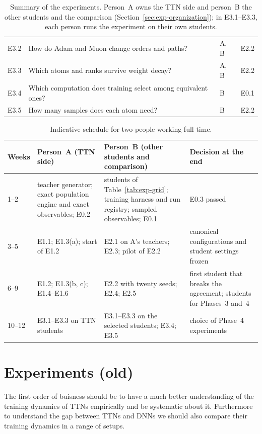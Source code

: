 \documentclass[11pt]{article}
\theoremstyle{definition}
\numberwithin{equation}{section}
\begin{document}
\begin{table}[tbp]
\begin{tabular}{p{}p{}p{}p{}}
\raggedright E3.2 & \raggedright How do Adam and Muon change orders and paths? & \raggedright A, B & \raggedright E2.2 \tabularnewline
\raggedright E3.3 & \raggedright Which atoms and ranks survive weight decay? & \raggedright A, B & \raggedright E2.2 \tabularnewline
\raggedright E3.4 & \raggedright Which computation does training select among equivalent ones? & \raggedright B & \raggedright E0.1 \tabularnewline
\raggedright E3.5 & \raggedright How many samples does each atom need? & \raggedright B & \raggedright E2.2 \tabularnewline
\hline
\end{tabular}
\caption{Summary of the experiments. Person~A owns the TTN side and person~B the other students and the comparison (Section~\ref{sec:exp-organization}); in E3.1--E3.3, each person runs the experiment on their own students.}
\label{tab:exp-summary}
\end{table}

\begin{table}[tbp]
\centering
\footnotesize
\renewcommand{\arraystretch}{1.25}
\begin{tabular}{p{}p{}p{}p{}}
\hline
\raggedright Weeks & \raggedright Person~A (TTN side) & \raggedright Person~B (other students and comparison) & \raggedright Decision at the end \tabularnewline
\hline
\raggedright 1--2 & \raggedright teacher generator; exact population engine and exact observables; E0.2 & \raggedright students of Table~\ref{tab:exp-grid}; training harness and run registry; sampled observables; E0.1 & \raggedright E0.3 passed \tabularnewline
\raggedright 3--5 & \raggedright E1.1; E1.3(a); start of E1.2 & \raggedright E2.1 on A's teachers; E2.3; pilot of E2.2 & \raggedright canonical configurations and student settings frozen \tabularnewline
\raggedright 6--9 & \raggedright E1.2; E1.3(b, c); E1.4--E1.6 & \raggedright E2.2 with twenty seeds; E2.4; E2.5 & \raggedright first student that breaks the agreement; students for Phases~3 and~4 \tabularnewline
\raggedright 10--12 & \raggedright E3.1--E3.3 on TTN students & \raggedright E3.1--E3.3 on the selected students; E3.4; E3.5 & \raggedright choice of Phase~4 experiments \tabularnewline
\hline
\end{tabular}
\caption{Indicative schedule for two people working full time.}
\label{tab:exp-plan}
\end{table}

\section{Experiments (old)}\label{sec:experiments-old}
The first order of buisness should be to have a much better understanding of the training dynamics of TTNs empirically and be systematic about it. Furthermore to understand the gap between TTNs and DNNs we should also compare their training dynamics in a range of setups. 
\end{document}
